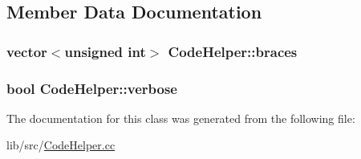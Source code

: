 \subsection{Member Data Documentation}
\hypertarget{classCodeHelper_a6905dd45316e980be4ed4f68cf4fdf39}{
\subsubsection[{braces}]{\setlength{\rightskip}{0pt plus 5cm}vector$<$unsigned int$>$ Code\+Helper\+::braces}}\label{classCodeHelper_a6905dd45316e980be4ed4f68cf4fdf39}
\hypertarget{classCodeHelper_a5afe3ed0547836993784dcdedc35438a}{
\subsubsection[{verbose}]{\setlength{\rightskip}{0pt plus 5cm}bool Code\+Helper\+::verbose}}\label{classCodeHelper_a5afe3ed0547836993784dcdedc35438a}


The documentation for this class was generated from the following file\+:\begin{DoxyCompactItemize}
\item 
lib/src/\hyperlink{CodeHelper_8cc}{Code\+Helper.\+cc}\end{DoxyCompactItemize}
